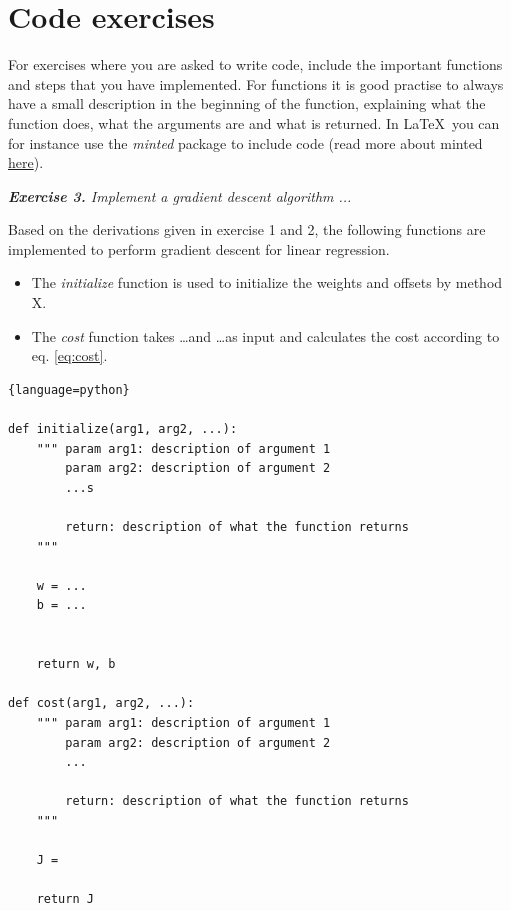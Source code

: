 \documentclass[a4paper,10pt]{article}
\begin{document}
\section{Code exercises}

For exercises where you are asked to write code, include the important functions and steps that you have implemented. For functions it is good practise to always have a small description in the beginning of the function, explaining what the function does, what the arguments are and what is returned. In \LaTeX\ you can for instance use the \emph{minted} package to include code 
(read more about minted \href{https://www.overleaf.com/learn/latex/Code_Highlighting_with_minted}{here}).


\hfill \break
\textit{\textbf{Exercise 3.} Implement a gradient descent algorithm ...}

Based on the derivations given in exercise 1 and 2, the following functions are implemented to perform gradient descent for linear regression. 

\begin{itemize}
\item
The \emph{initialize} function is used to initialize the weights and offsets by method X.
\item
The \emph{cost} function takes \ldots and \ldots as input and calculates the cost according to eq. \eqref{eq:cost}.
\end{itemize}

\begin{lstlisting}[frame=lines,framesep=2mm]{language=python}

def initialize(arg1, arg2, ...):
    """ param arg1: description of argument 1
        param arg2: description of argument 2
        ...s
        
        return: description of what the function returns
    """
    
    w = ...
    b = ...
    
    
    return w, b

def cost(arg1, arg2, ...):
    """ param arg1: description of argument 1
        param arg2: description of argument 2
        ...
        
        return: description of what the function returns
    """
    
    J = 
    
    return J

\end{lstlisting}
\end{document}
